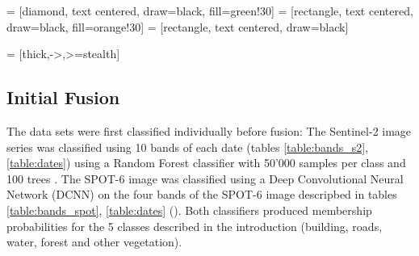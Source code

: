 \documentclass[10pt]{article}
\begin{document}
 = [diamond, text centered, draw=black, fill=green!30]
 = [rectangle, text centered, draw=black, fill=orange!30]
 = [rectangle, text centered, draw=black]

 = [thick,->,>=stealth]



\subsection{Initial Fusion}

The data sets were first classified individually before fusion: The Sentinel-2 image series was classified using 10 bands of each date (tables \ref{table:bands_s2}, \ref{table:dates}) using a Random Forest classifier with 50'000 samples per class and 100 trees \parencite{Breiman2001}. The SPOT-6 image was classified using a Deep Convolutional Neural Network (DCNN) on the four bands of the SPOT-6 image descripbed in tables \ref{table:bands_spot}, \ref{table:dates} (\cite{postadjian_investigating_2017}). Both classifiers produced membership probabilities for the 5 classes described in the introduction (building, roads, water, forest and other vegetation).\\
\end{document}
